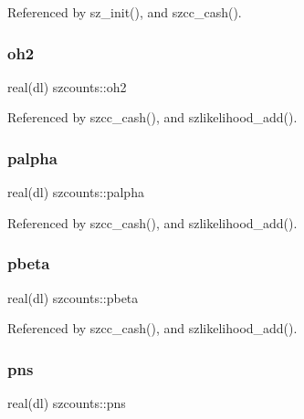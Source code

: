 Referenced by sz\+\_\+init(), and szcc\+\_\+cash().

\mbox{\label{namespaceszcounts_acb8cfec6e2fe1c42d1e65aa06c0b81df}} 
\subsubsection{\texorpdfstring{oh2}{oh2}}
{\footnotesize\ttfamily real(dl) szcounts\+::oh2\hspace{0.3cm}{\ttfamily [private]}}



Referenced by szcc\+\_\+cash(), and szlikelihood\+\_\+add().

\mbox{\label{namespaceszcounts_a162a76075580761ec2e15dd4e6d716fd}} 
\subsubsection{\texorpdfstring{palpha}{palpha}}
{\footnotesize\ttfamily real(dl) szcounts\+::palpha\hspace{0.3cm}{\ttfamily [private]}}



Referenced by szcc\+\_\+cash(), and szlikelihood\+\_\+add().

\mbox{\label{namespaceszcounts_a195fa99a01ff79fd80fe03fb78b8b573}} 
\subsubsection{\texorpdfstring{pbeta}{pbeta}}
{\footnotesize\ttfamily real(dl) szcounts\+::pbeta\hspace{0.3cm}{\ttfamily [private]}}



Referenced by szcc\+\_\+cash(), and szlikelihood\+\_\+add().

\mbox{\label{namespaceszcounts_afd77c97be9a90a59819249f5cc73760b}} 
\subsubsection{\texorpdfstring{pns}{pns}}
{\footnotesize\ttfamily real(dl) szcounts\+::pns\hspace{0.3cm}{\ttfamily [private]}}



